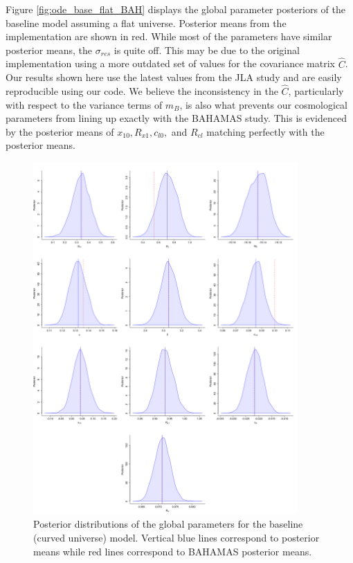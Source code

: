 Figure \ref{fig:ode_base_flat_BAH} displays the global parameter posteriors of the baseline model assuming a flat universe. Posterior means from the \citet{Shariff+others:2016} implementation are shown in red. While most of the parameters have similar posterior means, the $\sigma_{res}$ is quite off. This may be due to the original implementation using a more outdated set of values for the covariance matrix $\hat{C}$. Our results shown here use the latest values from the JLA study and are easily reproducible using our code. We believe the inconsistency in the $\hat{C}$, particularly with respect to the variance terms of $\hat{m}_B$, is also what prevents our cosmological parameters from lining up exactly with the BAHAMAS study. This is evidenced by the posterior means of $x_{10}, R_{x1}, c_{l0},$ and $R_{cl}$ matching perfectly with the \citet{Shariff+others:2016} posterior means.

\begin{figure}
\centering
	\includegraphics[width=0.9\textwidth]{figures/ode/base_curv_BAH_all.png}
\caption{Posterior distributions of the global parameters for the baseline (curved universe) model. Vertical blue lines correspond to posterior means while red lines correspond to BAHAMAS posterior means.}
\label{fig:ode_base_curv_BAH}
\end{figure}

